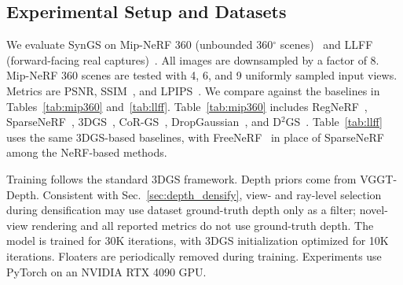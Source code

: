 \subsection{Experimental Setup and Datasets}
\label{sec:setup}

We evaluate SynGS on Mip-NeRF 360 (unbounded 360$^{\circ}$ scenes)~\cite{Barron22_MipNeRF360} and LLFF (forward-facing real captures)~\cite{Mildenhall19_LLFF}. All images are downsampled by a factor of 8. Mip-NeRF 360 scenes are tested with 4, 6, and 9 uniformly sampled input views. Metrics are PSNR, SSIM~\cite{Wang04_SSIM}, and LPIPS~\cite{Zhang18_LPIPS}. We compare against the baselines in Tables~\ref{tab:mip360} and~\ref{tab:llff}. Table~\ref{tab:mip360} includes RegNeRF~\cite{Niemeyer22_RegNeRF}, SparseNeRF~\cite{Wang23_SparseNeRF}, 3DGS~\cite{Kerbl23_3DGS}, CoR-GS~\cite{Zhang24_CoRGS}, DropGaussian~\cite{Park25_DropGaussian}, and D$^2$GS~\cite{Song26_D2GS}. Table~\ref{tab:llff} uses the same 3DGS-based baselines, with FreeNeRF~\cite{Yang23_FreeNeRF} in place of SparseNeRF among the NeRF-based methods.

Training follows the standard 3DGS framework. Depth priors come from VGGT-Depth. Consistent with Sec.~\ref{sec:depth_densify}, view- and ray-level selection during densification may use dataset ground-truth depth only as a filter; novel-view rendering and all reported metrics do not use ground-truth depth. The model is trained for 30K iterations, with 3DGS initialization optimized for 10K iterations. Floaters are periodically removed during training. Experiments use PyTorch on an NVIDIA RTX 4090 GPU.
